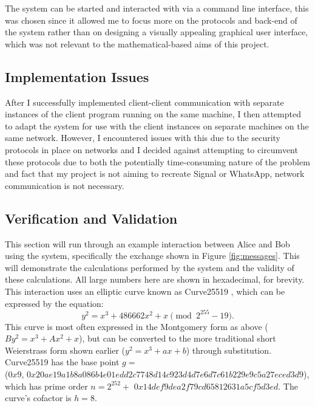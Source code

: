 \documentclass[12pt,a4paper]{article}
\begin{document}
The system can be started and interacted with via a command line interface, this was chosen since it allowed me to focus 
more on the protocols and back-end of the system rather than on designing a visually appealing graphical user interface, 
which was not relevant to the mathematical-based aims of this project. 


\subsection{Implementation Issues} \label{Implementation}
After I successfully implemented client-client communication with separate instances of the client program running on the 
same machine, I then attempted to adapt the system for use with the client instances on separate machines on the same network. 
However, I encountered issues with this due to the security protocols in place on networks and I decided against attempting to 
circumvent these protocols due to both the potentially time-consuming nature of the problem and fact that my project is not aiming 
to recreate Signal or WhatsApp, network communication is not necessary. 


\subsection{Verification and Validation} \label{Verification}
This section will run through an example interaction between Alice and Bob using the system, 
specifically the exchange shown in Figure \ref{fig:messages}. 
This will demonstrate the calculations performed by the system and the validity of these calculations. 
All large numbers here are shown in hexadecimal, for brevity. 
This interaction uses an elliptic curve known as Curve25519 \cite{10.1007/11745853_14}, 
which can be expressed by the equation: 
\begin{equation}
    y^2 = x^3 + 486662x^2 + x \pmod{2^{255}-19}.
\end{equation}
This curve is most often expressed in the Montgomery \cite{montgomery1987speeding} form as above ($By^2 = x^3 + Ax^2 + x$), 
but can be converted to the more traditional short Weierstrass form shown earlier ($y^2 = x^3 + ax + b$) through substitution. 
Curve25519 has the base point $g = $ \\
({\footnotesize $0x9$}, {\footnotesize $0x20ae19a1b8a086b4e01edd2c7748d14c923d4d7e6d7c61b229e9c5a27eced3d9$}), \\
which has prime order $n = 2^{252} +$ {\footnotesize $0x14def9dea2f79cd65812631a5cf5d3ed$}. 
The curve's cofactor is $h = 8$. 
\end{document}
